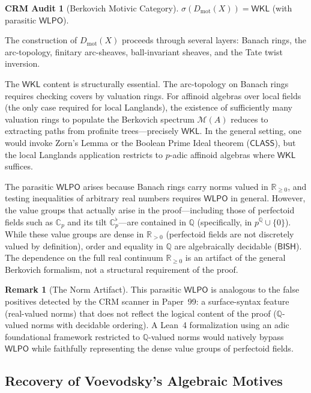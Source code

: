 \documentclass[11pt,a4paper]{article}
\theoremstyle{plain}
\theoremstyle{definition}
\newtheorem{remark}[theorem]{Remark}
\newtheorem{audit}[theorem]{CRM Audit}
\newcommand{\BISH}{\textsf{BISH}}
\newcommand{\WKL}{\textsf{WKL}}
\newcommand{\WLPO}{\textsf{WLPO}}
\newcommand{\CLASS}{\textsf{CLASS}}
\newcommand{\Dmot}{D_{\mathrm{mot}}}
\newcommand{\Q}{\mathbb{Q}}
\newcommand{\R}{\mathbb{R}}
\newcommand{\C}{\mathbb{C}}
\newcommand{\sig}{\sigma}
\begin{document}
\begin{audit}[Berkovich Motivic Category]\label{audit:dmot}
$\sig(\Dmot(X)) = \WKL$ (with parasitic $\WLPO$).
\end{audit}

The construction of $\Dmot(X)$ proceeds through several layers: Banach rings, the arc-topology, finitary arc-sheaves, ball-invariant sheaves, and the Tate twist inversion. 

The $\WKL$ content is structurally essential. The arc-topology on Banach rings requires checking covers by valuation rings. For affinoid algebras over local fields (the only case required for local Langlands), the existence of sufficiently many valuation rings to populate the Berkovich spectrum $\mathcal{M}(A)$ reduces to extracting paths from profinite trees---precisely $\WKL$. In the general setting, one would invoke Zorn's Lemma or the Boolean Prime Ideal theorem ($\CLASS$), but the local Langlands application restricts to $p$-adic affinoid algebras where $\WKL$ suffices.

The parasitic $\WLPO$ arises because Banach rings carry norms valued in $\R_{\geq 0}$, and testing inequalities of arbitrary real numbers requires $\WLPO$ in general. However, the value groups that actually arise in the proof---including those of perfectoid fields such as $\C_p$ and its tilt $\C_p^\flat$---are contained in $\Q$ (specifically, in $p^{\Q} \cup \{0\}$). While these value groups are dense in $\R_{>0}$ (perfectoid fields are not discretely valued by definition), order and equality in $\Q$ are algebraically decidable ($\BISH$). The dependence on the full real continuum $\R_{\geq 0}$ is an artifact of the general Berkovich formalism, not a structural requirement of the proof.

\begin{remark}[The Norm Artifact]
This parasitic $\WLPO$ is analogous to the false positives detected by the CRM scanner in Paper~99: a surface-syntax feature (real-valued norms) that does not reflect the logical content of the proof ($\Q$-valued norms with decidable ordering). A Lean~4 formalization using an adic foundational framework restricted to $\Q$-valued norms would natively bypass $\WLPO$ while faithfully representing the dense value groups of perfectoid fields.
\end{remark}


\subsection{Recovery of Voevodsky's Algebraic Motives}
\end{document}

